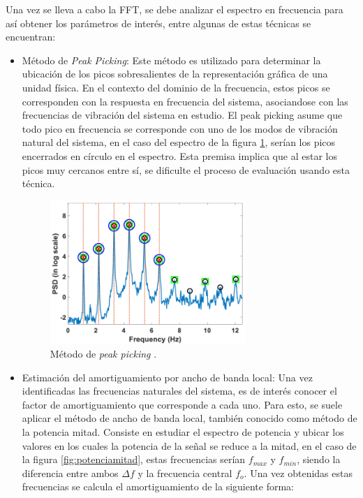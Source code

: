 Una vez se lleva a cabo la FFT, se debe analizar el espectro en frecuencia para así obtener los parámetros de interés, entre algunas de estas técnicas se encuentran:

\begin{itemize}
    \item Método de \textit{Peak Picking}: Este método es utilizado para determinar la ubicación de los picos sobresalientes de la representación gráfica de una unidad física. En el contexto del dominio de la frecuencia, estos picos se corresponden con la respuesta en frecuencia del sistema, asociandose con las frecuencias de vibración del sistema en estudio. El peak picking asume que todo pico en frecuencia se corresponde con uno de los modos de vibración natural del sistema, en el caso del espectro de la figura \ref{fig:peakpicking}, serían los picos encerrados en círculo en el espectro. Esta premisa implica que al estar los picos muy cercanos entre sí, se dificulte el proceso de evaluación usando esta técnica.
    
    \begin{figure}[H]
        \centering
        \includegraphics[width = 0.7\textwidth]{imagenes/cap1_marcoteo/peakpicking.png}
        \caption{Método de \textit{peak picking} \citep{peakpicking2021}.}
        \label{fig:peakpicking}
    \end{figure}
    
    \item Estimación del amortiguamiento por ancho de banda local: Una vez identificadas las frecuencias naturales del sistema, es de interés conocer el factor de amortiguamiento que corresponde a cada uno. Para esto, se suele aplicar el método de ancho de banda local, también conocido como método de la potencia mitad. Consiste en estudiar el espectro de potencia y ubicar los valores en los cuales la potencia de la señal se reduce a la mitad, en el caso de la figura \ref{fig:potenciamitad}, estas frecuencias serían $f_{max}$ y $f_{min}$, siendo la diferencia entre ambos $\Delta f$ y la frecuencia central $f_o$. Una vez obtenidas estas frecuencias se calcula el amortiguamiento de la siguiente forma:
    

\end{itemize}
